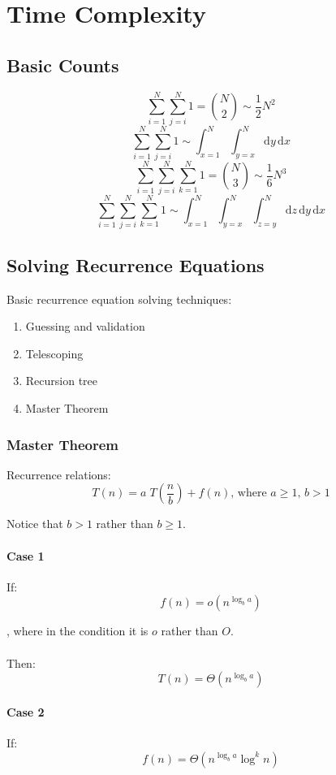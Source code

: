 \chapter{Time Complexity}

\section{Basic Counts}
$$
\sum_{i=1}^N{\sum_{j=i}^N{1}} = {N \choose 2} \sim \frac{1}{2} N^2
$$
$$
\sum_{i=1}^N{\sum_{j=i}^N{1}} \sim \int_{x=1}^N \int_{y=x}^N  \mathrm{d}y\, \mathrm{d}x
$$
$$
\sum_{i=1}^N{\sum_{j=i}^N{\sum_{k=1}^N{1}}} = {N \choose 3} \sim \frac{1}{6} N^3
$$
$$
\sum_{i=1}^N{\sum_{j=i}^N{\sum_{k=1}^N{1}}} \sim \int_{x=1}^N \int_{y=x}^N \int_{z=y}^N \mathrm{d}z\,
\mathrm{d}y\, \mathrm{d}x
$$

\section{Solving Recurrence Equations}
Basic recurrence equation solving techniques:
\begin{enumerate}
\item Guessing and validation
\item Telescoping
\item Recursion tree
\item Master Theorem
\end{enumerate}

\subsection{Master Theorem}
Recurrence relations:
$$T(n) = a \; T\!\left(\frac{n}{b}\right) + f(n)\mbox{, where }a \geq 1 \mbox{, } b > 1$$

Notice that $b>1$ rather than $b\geq1$.

\subsubsection*{Case 1}
If:
$$f(n) = o(n^{\log_b a})$$

, where in the condition it is $o$ rather than $O$. \\\\
Then:
$$T(n) = \Theta(n^{\log_b a})$$
\subsubsection*{Case 2}
If:
$$f(n) = \Theta(n^{\log_b a} \log^{k} n)$$

